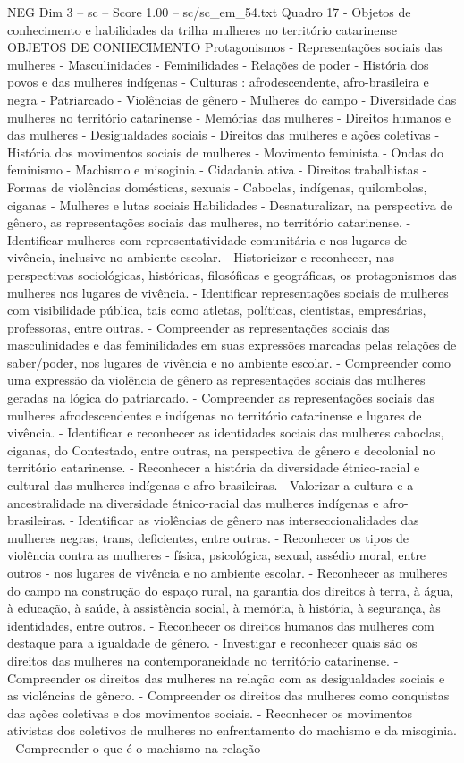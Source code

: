 \begin{textsample}{NEG Dim 3 – sc – Score 1.00 – sc/sc\_em\_54.txt}
Quadro 17 - Objetos de conhecimento e habilidades da trilha mulheres no território catarinense OBJETOS DE CONHECIMENTO Protagonismos - Representações sociais das mulheres - Masculinidades - Feminilidades - Relações de poder - História dos povos e das mulheres indígenas - Culturas : afrodescendente, afro-brasileira e negra - Patriarcado - Violências de gênero - Mulheres do campo - Diversidade das mulheres no território catarinense - Memórias das mulheres - Direitos humanos e das mulheres - Desigualdades sociais - Direitos das mulheres e ações coletivas - História dos movimentos sociais de mulheres - Movimento feminista - Ondas do feminismo - Machismo e misoginia - Cidadania ativa - Direitos trabalhistas - Formas de violências domésticas, sexuais - Caboclas, indígenas, quilombolas, ciganas - Mulheres e lutas sociais Habilidades - Desnaturalizar, na perspectiva de gênero, as representações sociais das mulheres, no território catarinense. - Identificar mulheres com representatividade comunitária e nos lugares de vivência, inclusive no ambiente escolar. - Historicizar e reconhecer, nas perspectivas sociológicas, históricas, filosóficas e geográficas, os protagonismos das mulheres nos lugares de vivência. - Identificar representações sociais de mulheres com visibilidade pública, tais como atletas, políticas, cientistas, empresárias, professoras, entre outras. - Compreender as representações sociais das masculinidades e das feminilidades em suas expressões marcadas pelas relações de saber/poder, nos lugares de vivência e no ambiente escolar. - Compreender como uma expressão da violência de gênero as representações sociais das mulheres geradas na lógica do patriarcado. - Compreender as representações sociais das mulheres afrodescendentes e indígenas no território catarinense e lugares de vivência. - Identificar e reconhecer as identidades sociais das mulheres caboclas, ciganas, do Contestado, entre outras, na perspectiva de gênero e decolonial no território catarinense. - Reconhecer a história da diversidade étnico-racial e cultural das mulheres indígenas e afro-brasileiras. - Valorizar a cultura e a ancestralidade na diversidade étnico-racial das mulheres indígenas e afro-brasileiras. - Identificar as violências de gênero nas interseccionalidades das mulheres negras, trans, deficientes, entre outras. - Reconhecer os tipos de violência contra as mulheres - física, psicológica, sexual, assédio moral, entre outros - nos lugares de vivência e no ambiente escolar. - Reconhecer as mulheres do campo na construção do espaço rural, na garantia dos direitos à terra, à água, à educação, à saúde, à assistência social, à memória, à história, à segurança, às identidades, entre outros. - Reconhecer os direitos humanos das mulheres com destaque para a igualdade de gênero. - Investigar e reconhecer quais são os direitos das mulheres na contemporaneidade no território catarinense. - Compreender os direitos das mulheres na relação com as desigualdades sociais e as violências de gênero. - Compreender os direitos das mulheres como conquistas das ações coletivas e dos movimentos sociais. - Reconhecer os movimentos ativistas dos coletivos de mulheres no enfrentamento do machismo e da misoginia. - Compreender o que é o machismo na relação 
\end{textsample}
